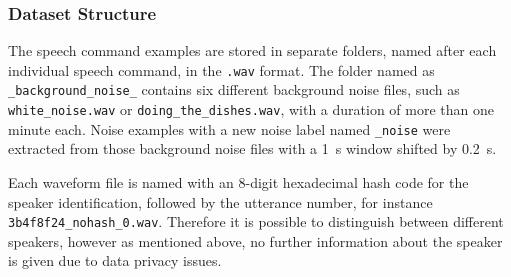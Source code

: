 \subsubsection{Dataset Structure}
The speech command examples are stored in separate folders, named after each individual speech command, in the \texttt{.wav} format.
The folder named as \texttt{\_background\_noise\_} contains six different background noise files, such as \texttt{white\_noise.wav} or \texttt{doing\_the\_dishes.wav}, with a duration of more than one minute each.
Noise examples with a new noise label named \texttt{_noise} were extracted from those background noise files with a \SI{1}{\second} window shifted by \SI{0.2}{\second}.

Each waveform file is named with an 8-digit hexadecimal hash code for the speaker identification, followed by the utterance number, for instance \texttt{3b4f8f24\_nohash\_0.wav}.
Therefore it is possible to distinguish between different speakers, however as mentioned above, no further information about the speaker is given due to data privacy issues.




